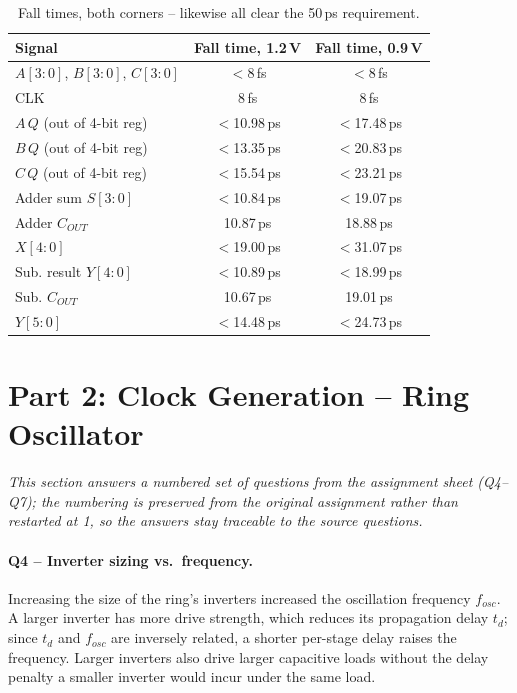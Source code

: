 \documentclass[11pt, a4paper]{article}
\begin{document}
\begin{table}[H]
\centering
\begin{tabular}{@{}lcc@{}}
\toprule
\rowcolor{accentblue!10}
\textbf{Signal} & \textbf{Fall time, 1.2\,V} & \textbf{Fall time, 0.9\,V} \\
\midrule
$A[3{:}0]$, $B[3{:}0]$, $C[3{:}0]$ & $<$8\,fs & $<$8\,fs \\
CLK & 8\,fs & 8\,fs \\
$A$\,$Q$ (out of 4-bit reg) & $<$10.98\,ps & $<$17.48\,ps \\
$B$\,$Q$ (out of 4-bit reg) & $<$13.35\,ps & $<$20.83\,ps \\
$C$\,$Q$ (out of 4-bit reg) & $<$15.54\,ps & $<$23.21\,ps \\
Adder sum $S[3{:}0]$ & $<$10.84\,ps & $<$19.07\,ps \\
Adder $C_{OUT}$ & 10.87\,ps & 18.88\,ps \\
$X[4{:}0]$ & $<$19.00\,ps & $<$31.07\,ps \\
Sub. result $Y[4{:}0]$ & $<$10.89\,ps & $<$18.99\,ps \\
Sub. $C_{OUT}$ & 10.67\,ps & 19.01\,ps \\
$Y[5{:}0]$ & $<$14.48\,ps & $<$24.73\,ps \\
\bottomrule
\end{tabular}
\caption{Fall times, both corners -- likewise all clear the 50\,ps requirement.}
\end{table}

\section{Part 2: Clock Generation -- Ring Oscillator}
\label{sec:part2}

\emph{This section answers a numbered set of questions from the assignment
sheet (Q4--Q7); the numbering is preserved from the original assignment
rather than restarted at 1, so the answers stay traceable to the source
questions.}

\paragraph{Q4 -- Inverter sizing vs.\ frequency.}
\label{sec:part2-q45}
Increasing the size of the ring's inverters increased the oscillation
frequency $f_{osc}$. A larger inverter has more drive strength, which
reduces its propagation delay $t_d$; since $t_d$ and $f_{osc}$ are
inversely related, a shorter per-stage delay raises the frequency.
Larger inverters also drive larger capacitive loads without the delay
penalty a smaller inverter would incur under the same load.
\end{document}

